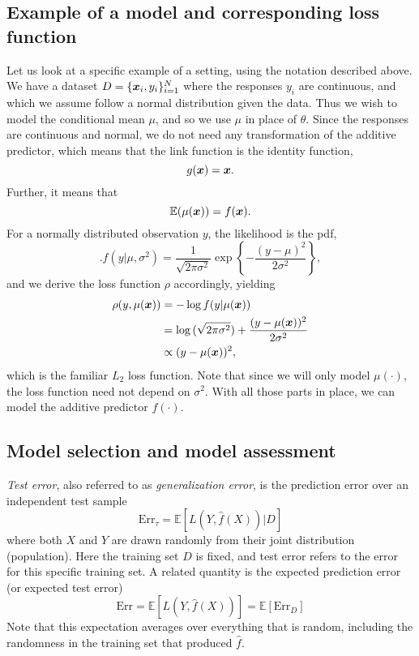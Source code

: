 \subsection{Example of a model and corresponding loss function}
Let us look at a specific example of a setting, using the notation described above.
We have a dataset $D=\{\bm{x}_i,y_i\}_{i=1}^N$ where the responses $y_i$ are continuous, and which we assume follow a normal distribution given the data.
Thus we wish to model the conditional mean $\mu$, and so we use $\mu$ in place of $\theta$.
Since the responses are continuous and normal, we do not need any transformation of the additive predictor, which means that the link function is the identity function,
\begin{equation}
    g(\bm{x})=\bm{x}.
\end{equation}
Further, it means that
\begin{equation}
    \mathbb{E}(\mu(\bm{x}))=f(\bm{x}).
\end{equation}
For a normally distributed observation $y$, the likelihood is the pdf,
\begin{equation}
    .f(y|\mu,\sigma^2)=\frac{1}{\sqrt{2\pi\sigma^2}}\exp\left\{-\frac{(y-\mu)^2}{2\sigma^2}\right\},
\end{equation}
and we derive the loss function $\rho$ accordingly, yielding
\begin{align*}
    \rho(y,\mu(\bm{x}))&=-\log{f(y|\mu(\bm{x}))}\\
    &=\log{(\sqrt{2\pi\sigma^2})}+\frac{(y-\mu(\bm{x}))^2}{2\sigma^2} \\
    &\propto(y-\mu(\bm{x}))^2,
\end{align*}
which is the familiar $L_2$ loss function. Note that since we will only model $\mu(\cdot)$, the loss function need not depend on $\sigma^2$. With all those parts in place, we can model the additive predictor $f(\cdot)$.

\subsection{Model selection and model assessment}
\textit{Test error}, also referred to as \textit{generalization error}, is the prediction error over an independent test sample
\begin{equation}\label{eq:test-error}
    \text{Err}_{\tau}=\mathbb{E}[L(Y,\hat{f}(X))|D]
\end{equation}
where both $X$ and $Y$ are drawn randomly from their joint distribution (population).
Here the training set $D$ is fixed, and test error refers to the error for this specific training set.
A related quantity is the expected prediction error (or expected test error)
\begin{equation}
    \text{Err}=\mathbb{E}[L(Y,\hat{f}(X))]=\mathbb{E}\left[\text{Err}_D\right]
\end{equation}
Note that this expectation averages over everything that is random, including the randomness in the training set that produced $\hat{f}$.

